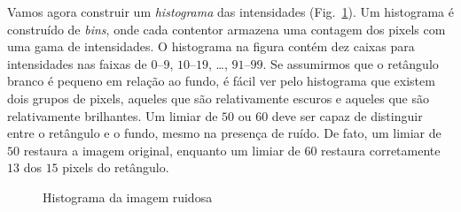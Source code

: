 
Vamos agora construir um \emph{histograma} das intensidades (Fig.~\ref{fig.hist}). Um histograma é construído de \emph{bins}, onde cada contentor armazena uma contagem dos pixels com uma gama de intensidades. O histograma na figura contém dez caixas para intensidades nas faixas de $0$--$9$, $10$--$19$, \ldots, $91$--$99$. Se assumirmos que o retângulo branco é pequeno em relação ao fundo, é fácil ver pelo histograma que existem dois grupos de pixels, aqueles que são relativamente escuros e aqueles que são relativamente brilhantes. Um limiar de $50$ ou $60$ deve ser capaz de distinguir entre o retângulo e o fundo, mesmo na presença de ruído. De fato, um limiar de $50$ restaura a imagem original, enquanto um limiar de $60$ restaura corretamente $13$ dos $15$ pixels do retângulo.

\begin{figure}
\begin{center}
\caption{Histograma da imagem ruidosa}\label{fig.hist}
\end{center}
\end{figure}

